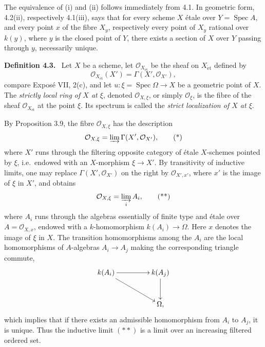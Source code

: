 \documentclass[11pt]{article}
\newcommand{\Oo}{\mathcal{O}}
\newcommand{\Spec}{\operatorname{Spec}}
\newcommand{\et}{\mathrm{\acute{e}t}}
\newcommand{\ie}{i.e.\ }
\newenvironment{statement}[1]{\par\medskip\noindent\textbf{#1.}\ }{\par\medskip}
\begin{document}
The equivalence of (i) and (ii) follows immediately from 4.1. In geometric form, 4.2(ii), respectively 4.1(iii), says that for every scheme \(X\) \'etale over \(Y=\Spec A\), and every point \(x\) of the fibre \(X_y\), respectively every point of \(X_y\) rational over \(k(y)\), where \(y\) is the closed point of \(Y\), there exists a section of \(X\) over \(Y\) passing through \(y\), necessarily unique.

\begin{statement}{Definition 4.3}
Let \(X\) be a scheme, let \(\Oo_{X_{\et}}\) be the sheaf on \(X_{\et}\) defined by
\[
\Oo_{X_{\et}}(X')=\Gamma(X',\Oo_{X'}),
\]
compare Expos\'e VII, 2(c), and let \(u:\xi=\Spec\Omega\to X\) be a geometric point of \(X\). The \emph{strictly local ring of \(X\) at \(\xi\)}, denoted \(\Oo_{X,\xi}\), or simply \(\Oo_\xi\), is the fibre of the sheaf \(\Oo_{X_{\et}}\) at the point \(\xi\). Its spectrum is called the \emph{strict localization of \(X\) at \(\xi\)}.
\end{statement}

By Proposition 3.9, the fibre \(\Oo_{X,\xi}\) has the description
\[
\Oo_{X,\xi}=\varinjlim \Gamma(X',\Oo_{X'}),
\tag{*}
\]
where \(X'\) runs through the filtering opposite category of \'etale \(X\)-schemes pointed by \(\xi\), \ie endowed with an \(X\)-morphism \(\xi\to X'\). By transitivity of inductive limits, one may replace \(\Gamma(X',\Oo_{X'})\) on the right by \(\Oo_{X',x'}\), where \(x'\) is the image of \(\xi\) in \(X'\), and obtains
\[
\Oo_{X,\xi}=\varinjlim_i A_i,
\tag{**}
\]
where \(A_i\) runs through the algebras essentially of finite type and \'etale over \(A=\Oo_{X,x}\), endowed with a \(k\)-homomorphism \(k(A_i)\to\Omega\). Here \(x\) denotes the image of \(\xi\) in \(X\). The transition homomorphisms among the \(A_i\) are the local homomorphisms of \(A\)-algebras \(A_i\to A_j\) making the corresponding triangle commute,
\[
\xymatrix@R=1.0cm@C=1.6cm{
k(A_i)\ar[r]\ar[rd]&k(A_j)\ar[d]\\
&\Omega,
}
\]
which implies that if there exists an admissible homomorphism from \(A_i\) to \(A_j\), it is unique. Thus the inductive limit \((**)\) is a limit over an increasing filtered ordered set.
\end{document}

